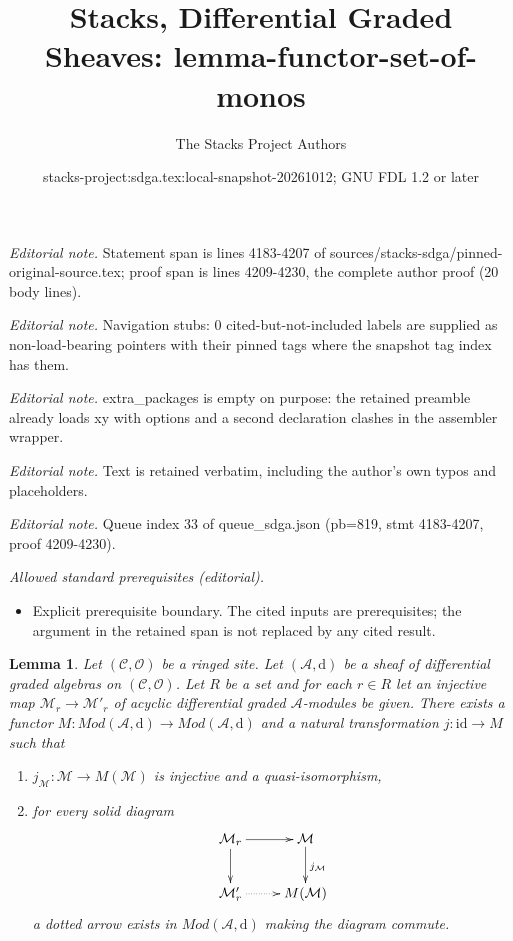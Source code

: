 \documentclass[10pt,a4paper]{amsart}
\title{Stacks, Differential Graded Sheaves: lemma-functor-set-of-monos}
\author{The Stacks Project Authors}
\date{stacks-project:sdga.tex:local-snapshot-20261012; GNU FDL 1.2 or later}
\theoremstyle{plain}
\newtheorem{lemma}[subsection]{Lemma}
\theoremstyle{definition}
\theoremstyle{remark}
\numberwithin{equation}{subsection}
\begin{document}
\maketitle
\noindent\textit{Editorial note.} Statement span is lines 4183-4207 of sources/stacks-sdga/pinned-original-source.tex; proof span is lines 4209-4230, the complete author proof (20 body lines).\par\medskip
\noindent\textit{Editorial note.} Navigation stubs: 0 cited-but-not-included labels are supplied as non-load-bearing pointers with their pinned tags where the snapshot tag index has them.\par\medskip
\noindent\textit{Editorial note.} extra\_packages is empty on purpose: the retained preamble already loads xy with options and a second declaration clashes in the assembler wrapper.\par\medskip
\noindent\textit{Editorial note.} Text is retained verbatim, including the author's own typos and placeholders.\par\medskip
\noindent\textit{Editorial note.} Queue index 33 of queue\_sdga.json (pb=819, stmt 4183-4207, proof 4209-4230).\par\medskip
\noindent\textit{Allowed standard prerequisites (editorial).}\begin{itemize}
\item Explicit prerequisite boundary. The cited inputs are prerequisites; the argument in the retained span is not replaced by any cited result.
\end{itemize}\medskip
\begin{lemma}
\label{lemma-functor-set-of-monos}
Let $(\mathcal{C}, \mathcal{O})$ be a ringed site.
Let $(\mathcal{A}, \text{d})$
be a sheaf of differential graded algebras on $(\mathcal{C}, \mathcal{O})$.
Let $R$ be a set and for each $r \in R$ let an injective map
$\mathcal{M}_r \to \mathcal{M}'_r$ of
acyclic differential graded $\mathcal{A}$-modules be given.
There exists a functor $M : \textit{Mod}(\mathcal{A}, \text{d}) \to
\textit{Mod}(\mathcal{A}, \text{d})$ and a natural transformation
$j : \text{id} \to M$ such that
\begin{enumerate}
\item $j_\mathcal{M} : \mathcal{M} \to M(\mathcal{M})$ is injective
and a quasi-isomorphism,
\item for every solid diagram
$$
\xymatrix{
\mathcal{M}_r \ar[r] \ar[d] & \mathcal{M} \ar[d]^{j_\mathcal{M}} \\
\mathcal{M}'_r \ar@{..>}[r] & M(\mathcal{M})
}
$$
a dotted arrow exists in $\textit{Mod}(\mathcal{A}, \text{d})$
making the diagram commute.
\end{enumerate}
\end{lemma}
\end{document}
